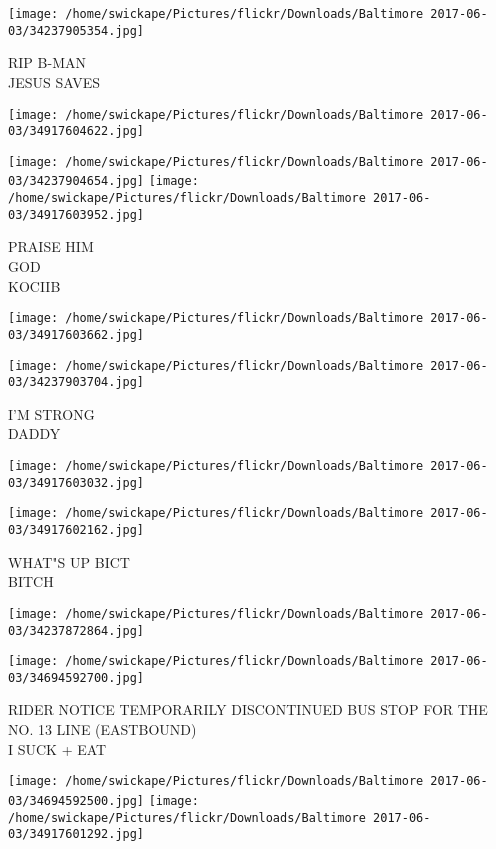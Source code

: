 \documentclass[10pt,letterpaper]{article}
\begin{document}
\vspace{0.25in}
\texttt{[image: /home/swickape/Pictures/flickr/Downloads/Baltimore 2017-06-03/34237905354.jpg]}

RIP B{-}MAN\\
JESUS SAVES
\pagebreak

\texttt{[image: /home/swickape/Pictures/flickr/Downloads/Baltimore 2017-06-03/34917604622.jpg]}

\vspace{0.25in}
\texttt{[image: /home/swickape/Pictures/flickr/Downloads/Baltimore 2017-06-03/34237904654.jpg]}
\texttt{[image: /home/swickape/Pictures/flickr/Downloads/Baltimore 2017-06-03/34917603952.jpg]}

PRAISE HIM\\
GOD\\
KOCIIB
\pagebreak

\texttt{[image: /home/swickape/Pictures/flickr/Downloads/Baltimore 2017-06-03/34917603662.jpg]}

\vspace{0.25in}
\texttt{[image: /home/swickape/Pictures/flickr/Downloads/Baltimore 2017-06-03/34237903704.jpg]}

I'M STRONG\\
DADDY
\pagebreak

\texttt{[image: /home/swickape/Pictures/flickr/Downloads/Baltimore 2017-06-03/34917603032.jpg]}

\vspace{0.25in}
\texttt{[image: /home/swickape/Pictures/flickr/Downloads/Baltimore 2017-06-03/34917602162.jpg]}

WHAT"S UP BICT\\
BITCH
\pagebreak

\texttt{[image: /home/swickape/Pictures/flickr/Downloads/Baltimore 2017-06-03/34237872864.jpg]}

\vspace{0.25in}
\texttt{[image: /home/swickape/Pictures/flickr/Downloads/Baltimore 2017-06-03/34694592700.jpg]}

RIDER NOTICE TEMPORARILY DISCONTINUED BUS STOP FOR THE NO. 13 LINE (EASTBOUND)\\
I SUCK + EAT
\pagebreak

\texttt{[image: /home/swickape/Pictures/flickr/Downloads/Baltimore 2017-06-03/34694592500.jpg]}
\texttt{[image: /home/swickape/Pictures/flickr/Downloads/Baltimore 2017-06-03/34917601292.jpg]}
\end{document}
